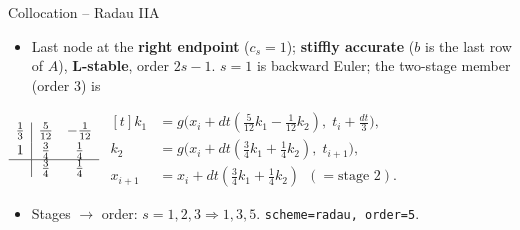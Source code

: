 \documentclass[11pt,aspectratio=169]{beamer}
\begin{document}
\begin{frame}{Collocation -- Radau IIA}

\begin{itemize}
\item Last node at the \textbf{right endpoint} ($c_s=1$); \textbf{stiffly
  accurate} ($b$ is the last row of $A$), \textbf{L-stable}, order $2s{-}1$.
  $s{=}1$ is backward Euler; the two-stage member (order 3) is
\end{itemize}

\begin{center}
\small
$\begin{array}{c|cc}
  \tfrac13 & \tfrac{5}{12} & -\tfrac1{12}\\[2pt] 1 & \tfrac34 & \tfrac14\\ \hline
  & \tfrac34 & \tfrac14
\end{array}$
\quad
$\begin{aligned}[t]
k_1 &= g\bigl(x_i + dt(\tfrac{5}{12} k_1 - \tfrac1{12} k_2),\; t_i{+}\tfrac{dt}{3}\bigr),\\
k_2 &= g\bigl(x_i + dt(\tfrac34 k_1 + \tfrac14 k_2),\; t_{i+1}\bigr),\\
x_{i+1} &= x_i + dt(\tfrac34 k_1 + \tfrac14 k_2)\ \;(= \text{stage }2).
\end{aligned}$
\end{center}

\begin{itemize}
\item Stages $\to$ order: $s=1,2,3 \Rightarrow 1,3,5$. \quad
  \texttt{scheme=radau, order=5}.
\end{itemize}

\end{frame}
\end{document}
